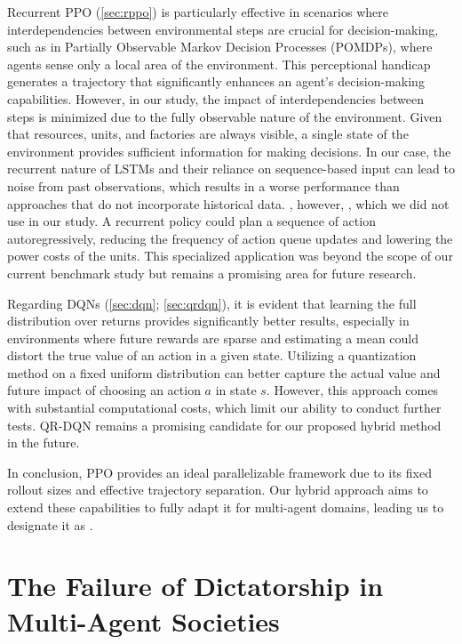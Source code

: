 \bigskip

\noindent Recurrent PPO (\autoref{sec:rppo}) is particularly effective in scenarios where interdependencies between environmental steps are crucial for decision-making, such as in Partially Observable Markov Decision Processes (POMDPs), where agents sense only a local area of the environment. This perceptional handicap generates a trajectory that significantly enhances an agent's decision-making capabilities. However, in our study, the impact of interdependencies between steps is minimized due to the fully observable nature of the environment. Given that resources, units, and factories are always visible, a single state of the environment provides sufficient information for making decisions. In our case, the recurrent nature of LSTMs and their reliance on sequence-based input can lead to noise from past observations, which results in a worse performance than approaches that do not incorporate historical data. , however, , which we did not use in our study. A recurrent policy could plan a sequence of action autoregressively, reducing the frequency of action queue updates and lowering the power costs of the units. This specialized application was beyond the scope of our current benchmark study but remains a promising area for future research.

\bigskip

\noindent Regarding DQNs (\autoref{sec:dqn}; \autoref{sec:qrdqn}), it is evident that learning the full distribution over returns provides significantly better results, especially in environments where future rewards are sparse and estimating a mean could distort the true value of an action in a given state. Utilizing a quantization method on a fixed uniform distribution can better capture the actual value and future impact of choosing an action $a$ in state $s$. However, this approach comes with substantial computational costs, which limit our ability to conduct further tests. QR-DQN remains a promising candidate for our proposed hybrid method in the future.

\bigskip

\noindent In conclusion, PPO provides an ideal parallelizable framework due to its fixed rollout sizes and effective trajectory separation. Our hybrid approach aims to extend these capabilities to fully adapt it for multi-agent domains, leading us to designate it as .

\section{The Failure of Dictatorship in Multi-Agent Societies}
\label{ch:disc-dictatorship-failure}

